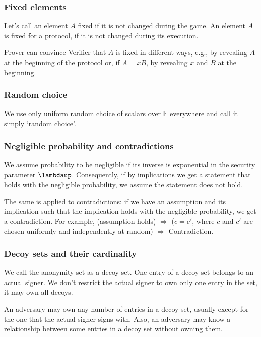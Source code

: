 \documentclass{mathcryptology} %
\theoremstyle{title}
\theoremstyle{titleof}
\begin{document}
\subsubsection{Fixed elements}
    Let's call an element $A$ fixed if it is not changed during the game. An element $A$ is fixed for a protocol, if it is not changed during its execution.

    Prover can convince Verifier that $A$ is fixed in different ways, e.g., by revealing $A$ at the beginning of the protocol or, if $A=xB$, by revealing $x$ and $B$ at the beginning.


\subsubsection{Random choice}
    We use only uniform random choice of scalars over $\mathds{F}$ everywhere and call it simply `random choice'.


\subsubsection{Negligible probability and contradictions}
    We assume probability to be negligible if its inverse is exponential in the security parameter $\bm{\lambdaup}$. Consequently, if by implications we get a statement that holds with the negligible probability, we assume the statement does not hold.

    The same is applied to contradictions: if we have an assumption and its implication such that the implication holds with the negligible probability, we get a contradiction. For example, (assumption holds) $\Rightarrow$ ($c=c'$, where $c$ and $c'$ are chosen uniformly and independently at random) $\Rightarrow$ Contradiction.


\subsubsection{Decoy sets and their cardinality}
    We call the anonymity set as a decoy set. One entry of a decoy set belongs to an actual signer. We don't restrict the actual signer to own only one entry in the set, it may own all decoys.

    An adversary may own any number of entries in a decoy set, usually except for the one that the actual signer signs with. Also, an adversary may know a relationship between some entries in a decoy set without owning them.
\end{document}
